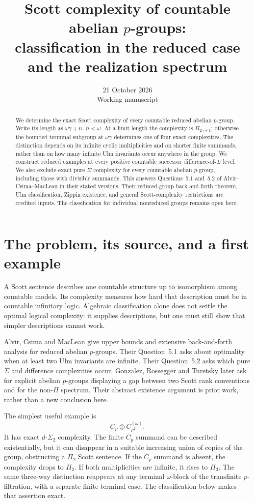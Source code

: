 \documentclass[11pt]{article}
\title{Scott complexity of countable abelian $p$-groups:\\classification in the reduced case and the realization spectrum}
\author{}
\date{21 October 2026\\Working manuscript}
\begin{document}
\maketitle
\begin{abstract}
We determine the exact Scott complexity of every countable reduced
abelian $p$-group. Write its length as $\omega\gamma+n$, $n<\omega$.
At a limit length the complexity is $\Pi_{2\gamma+1}$; otherwise the
bounded terminal subgroup at $\omega\gamma$ determines one of four
exact complexities. The distinction depends on its infinite cyclic
multiplicities and on shorter finite summands, rather than on how many
infinite Ulm invariants occur anywhere in the group. We construct reduced
examples at every positive countable successor difference-of-$\Sigma$
level. We also exclude exact pure $\Sigma$ complexity for every countable
abelian $p$-group, including those with divisible summands. This answers
Questions~5.1 and~5.2 of Alvir--Csima--MacLean in their stated versions.
Their reduced-group back-and-forth theorem, Ulm classification, Zippin
existence, and general Scott-complexity restrictions are credited inputs.
The classification for individual nonreduced groups remains open here.
\end{abstract}

\section{The problem, its source, and a first example}
A Scott sentence describes one countable structure up to isomorphism
among countable models. Its complexity measures how hard that description
must be in countable infinitary logic. Algebraic classification alone does
not settle the optimal logical complexity: it supplies descriptions, but
one must still show that simpler descriptions cannot work.

Alvir, Csima and MacLean \cite{ACM} give upper bounds and extensive
back-and-forth analysis for reduced abelian $p$-groups. Their
Question~5.1 asks about optimality when at least two Ulm invariants are
infinite. Their Question~5.2 asks which pure $\Sigma$ and difference
complexities occur. Gonzalez, Rossegger and Turetsky \cite{GRT} later
ask for explicit abelian $p$-groups displaying a gap between two Scott
rank conventions and for the non-$\Pi$ spectrum. Their abstract
existence argument is prior work, rather than a new conclusion here.

The simplest useful example is
\[
 C_p\oplus C_{p^2}^{(\omega)}.
\]
It has exact $d\text{-}\Sigma_2$ complexity. The finite $C_p$ summand
can be described existentially, but it can disappear in a suitable
increasing union of copies of the group, obstructing a $\Pi_2$ Scott
sentence. If the $C_p$ summand is absent, the complexity drops to
$\Pi_2$. If both multiplicities are infinite, it rises to $\Pi_3$.
The same three-way distinction reappears at any terminal
$\omega$-block of the transfinite $p$-filtration, with a separate
finite-terminal case. The classification below makes that assertion exact.
\end{document}
